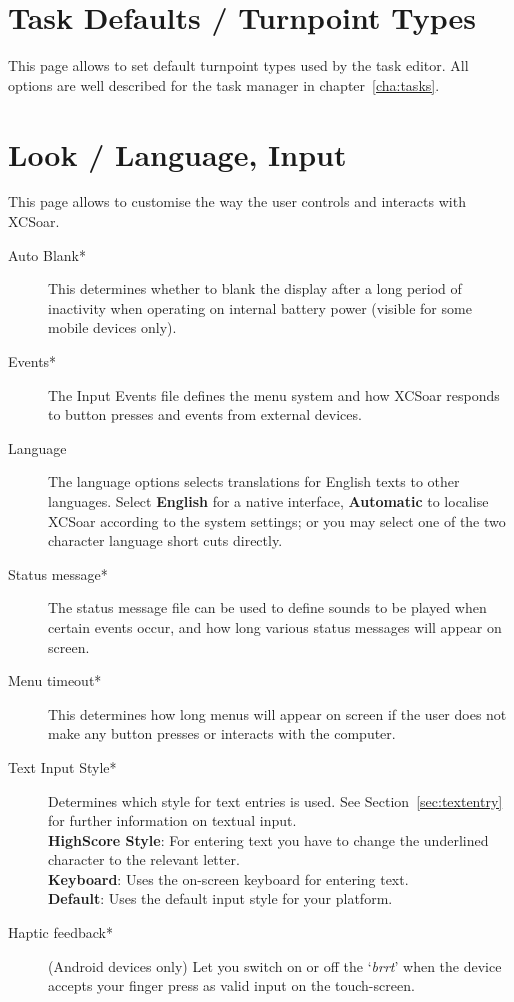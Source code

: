 \section{Task Defaults / Turnpoint Types}

This page allows to set default turnpoint types used by the task editor. All 
options are well described for the task manager in chapter~\ref{cha:tasks}.


\section{Look / Language, Input}\label{sec:interface}

This page allows to customise the way the user controls and interacts with
XCSoar.

\begin{description}
\item[Auto Blank*]  This determines whether to blank the display after a long
  period of inactivity when operating on internal battery power (visible for some mobile 
  devices only).
\item[Events*]  The Input Events file defines the menu system and how XCSoar
  responds to button presses and events from external devices.
\item[Language]  The language options selects translations for English texts to
  other languages.  Select {\bf English} for a native interface, {\bf Automatic}
  to localise XCSoar according to the system settings; or you may select one of 
  the two character language short cuts directly.
\item[Status message*]  The status message file can be used to define sounds to 
  be played when certain events occur, and how long various status messages will 
  appear on screen.
\item[Menu timeout*]  This determines how long menus will appear on screen if the user
  does not make any button presses or interacts with the computer.
\item[Text Input Style*]  Determines which style for text entries is used. 
  See Section~\ref{sec:textentry} for further information on textual input. \\
  {\bf HighScore Style}: For entering text you have to change the underlined 
  character to the relevant letter. \\
  {\bf Keyboard}: Uses the on-screen keyboard for entering text. \\
  {\bf Default}: Uses the default input style for your platform.
\item[Haptic feedback*]  (Android devices only) Let you switch on or off the `{\it brrt}' 
  when the device accepts your finger press as valid input on the touch-screen.
\end{description}

